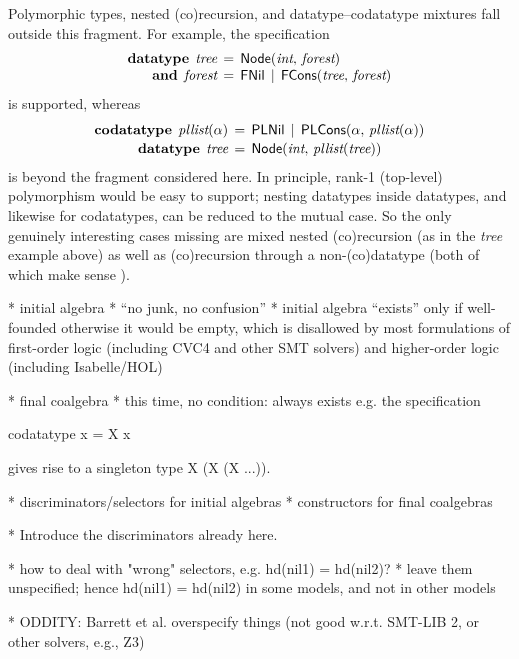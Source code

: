 \documentclass[a4paper,oribibl,envcountsame,draft]{llncs}
\newcommand\keyw[1]{\textbf{#1}}
\newcommand\const[1]{\textsf{#1}}
\newcommand\ty[1]{\textit{#1}}
\begin{document}
Polymorphic types, nested (co)recursion, and datatype--codatatype mixtures fall
outside this fragment. For example, the specification
\[\begin{aligned}[t]
      \keyw{datatype}\;\, \ty{tree} & \,=\, \const{Node}(\ty{int},\, \ty{forest}) \\[-\jot]
      \keyw{and}\;\, \ty{forest} & \,=\, \const{FNil} \,\mid\, \const{FCons}(\ty{tree},\, \ty{forest})
\end{aligned}
\]
is supported, whereas
\[\begin{aligned}[t]
      \keyw{codatatype}\; \,\ty{pllist}(\alpha) & \,=\, \const{PLNil} \,\mid\, \const{PLCons}(\alpha,\, \ty{pllist}(\alpha)) \\[-.5\jot]
      \keyw{datatype}\;\, \ty{tree} & \,=\, \const{Node}(\ty{int},\, \ty{pllist}(\ty{tree}))
\end{aligned}
\]
is beyond the fragment considered here. In principle, rank-1 (top-level)
polymorphism would be easy to support; nesting datatypes inside datatypes,
and likewise for codatatypes, can be reduced to the mutual case. So the only
genuinely interesting cases missing are mixed nested (co)recursion
(as in the \ty{tree} example above) as well as (co)recursion through a
non-(co)datatype (both of which make sense \cite{blanchette-et-al-2014-codata}).


  * initial algebra
    * ``no junk, no confusion''
    * initial algebra ``exists'' only if well-founded
      otherwise it would be empty, which is disallowed by most formulations of
      first-order logic (including CVC4 and other SMT solvers)
      and higher-order logic (including Isabelle/HOL)

  * final coalgebra
    * this time, no condition: always exists
    e.g. the specification

      codatatype x = X x

    gives rise to a singleton type {X (X (X ...))}.

  * discriminators/selectors for initial algebras
  * constructors for final coalgebras

  * Introduce the discriminators already here.

  * how to deal with "wrong" selectors, e.g.
        hd(nil1) = hd(nil2)?
      * leave them unspecified; hence hd(nil1) = hd(nil2) in some models,
        and not in other models

  * ODDITY: Barrett et al. overspecify things (not good w.r.t. SMT-LIB 2, or
    other solvers, e.g., Z3)
\end{document}

